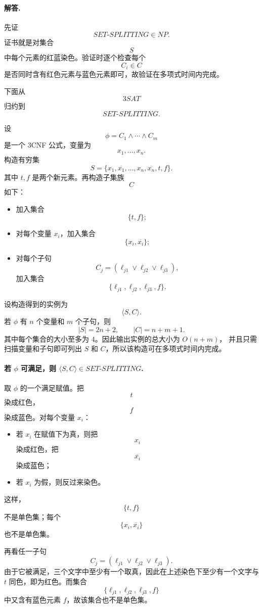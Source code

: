 \begin{answerred}
\paragraph{解答.}
先证
\[
SET\text{-}SPLITTING\in NP.
\]
证书就是对集合
\[
S
\]
中每个元素的红蓝染色。验证时逐个检查每个
\[
C_i\in C
\]
是否同时含有红色元素与蓝色元素即可，故验证在多项式时间内完成。

\medskip
下面从
\[
3SAT
\]
归约到
\[
SET\text{-}SPLITTING.
\]

\medskip
设
\[
\phi=C_1\wedge\cdots\wedge C_m
\]
是一个 3CNF 公式，变量为
\[
x_1,\dots,x_n.
\]
构造有穷集
\[
S=\{x_1,\overline{x_1},\dots,x_n,\overline{x_n},t,f\}.
\]
其中 $t,f$ 是两个新元素。再构造子集族
\[
C
\]
如下：

\begin{itemize}
  \item 加入集合
  \[
  \{t,f\};
  \]
  \item 对每个变量 $x_i$，加入集合
  \[
  \{x_i,\overline{x_i}\};
  \]
  \item 对每个子句
  \[
  C_j=(\ell_{j1}\vee \ell_{j2}\vee \ell_{j3}),
  \]
  加入集合
  \[
  \{\ell_{j1},\ell_{j2},\ell_{j3},f\}.
  \]
\end{itemize}

设构造得到的实例为
\[
\langle S,C\rangle.
\]
若 $\phi$ 有 $n$ 个变量和 $m$ 个子句，则
\[
|S|=2n+2,\qquad |C|=n+m+1.
\]
其中每个集合的大小至多为 $4$。因此输出实例的总大小为 $O(n+m)$，
并且只需扫描变量和子句即可列出 $S$ 和 $C$，所以该构造可在多项式时间内完成。

\paragraph{若 $\phi$ 可满足，则 $\langle S,C\rangle\in SET\text{-}SPLITTING$.}
取 $\phi$ 的一个满足赋值。把
\[
t
\]
染成红色，
\[
f
\]
染成蓝色。对每个变量 $x_i$：

\begin{itemize}
  \item 若 $x_i$ 在赋值下为真，则把
  \[
  x_i
  \]
  染成红色，把
  \[
  \overline{x_i}
  \]
  染成蓝色；
  \item 若 $x_i$ 为假，则反过来染色。
\end{itemize}

这样，
\[
\{t,f\}
\]
不是单色集；每个
\[
\{x_i,\overline{x_i}\}
\]
也不是单色集。

再看任一子句
\[
C_j=(\ell_{j1}\vee \ell_{j2}\vee \ell_{j3}).
\]
由于它被满足，三个文字中至少有一个取真，因此在上述染色下至少有一个文字与 $t$ 同色，即为红色。而集合
\[
\{\ell_{j1},\ell_{j2},\ell_{j3},f\}
\]
中又含有蓝色元素 $f$，故该集合也不是单色集。


\end{answerred}

